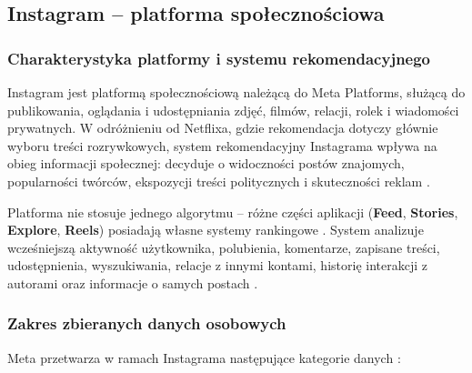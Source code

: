 \documentclass[12pt, a4paper]{article}
\begin{document}
\subsection{Instagram -- platforma społecznościowa}

\subsubsection{Charakterystyka platformy i systemu rekomendacyjnego}

Instagram jest platformą społecznościową należącą do Meta Platforms, służącą do publikowania, oglądania i udostępniania zdjęć, filmów, relacji, rolek i wiadomości prywatnych. W odróżnieniu od Netflixa, gdzie rekomendacja dotyczy głównie wyboru treści rozrywkowych, system rekomendacyjny Instagrama wpływa na obieg informacji społecznej: decyduje o widoczności postów znajomych, popularności twórców, ekspozycji treści politycznych i skuteczności reklam \cite{ig_ranking}.

Platforma nie stosuje jednego algorytmu -- różne części aplikacji (\textbf{Feed}, \textbf{Stories}, \textbf{Explore}, \textbf{Reels}) posiadają własne systemy rankingowe \cite{ig_ranking, ig_creators}. System analizuje wcześniejszą aktywność użytkownika, polubienia, komentarze, zapisane treści, udostępnienia, wyszukiwania, relacje z innymi kontami, historię interakcji z autorami oraz informacje o samych postach \cite{ig_ranking, ig_creators}.

\subsubsection{Zakres zbieranych danych osobowych}

Meta przetwarza w ramach Instagrama następujące kategorie danych \cite{meta_privacy}:
\end{document}
